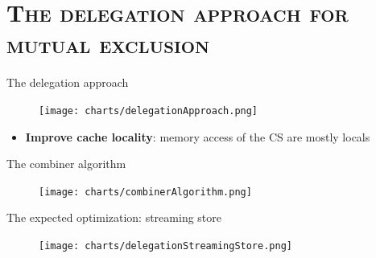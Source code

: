 \documentclass[xcolor=x11names,compress]{beamer}
\renewcommand{\(}{\begin{columns}}
\renewcommand{\)}{\end{columns}}
\newcommand{\<}[1]{\begin{column}{#1}}
\renewcommand{\>}{\end{column}}
\begin{document}

\section{\scshape The delegation approach for mutual exclusion}
\frame{\tableofcontents}









\begin{frame}{The delegation approach}
	\begin{figure}[t]
	\begin{center}
		\subfloat
	    {
			\texttt{[image: charts/delegationApproach.png]}
		}
	\end{center}
	\end{figure}

	\begin{itemize}
		\item \textbf{Improve cache locality}: memory access of the CS are mostly locals
	\end{itemize}
\end{frame}



\begin{frame}{The combiner algorithm}
	\begin{figure}[t]
	\begin{center}
		\subfloat
		{
			\texttt{[image: charts/combinerAlgorithm.png]}
		}
	\end{center}
	\end{figure}
\end{frame}



\begin{frame}{The expected optimization: streaming store}
	\begin{figure}[t]
	\begin{center}
		\subfloat
		{
			\texttt{[image: charts/delegationStreamingStore.png]}
		}
	\end{center}
	\end{figure}
\end{frame}
\end{document}
